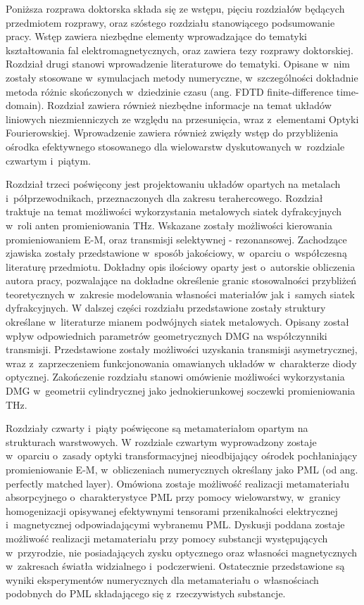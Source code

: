 Poniższa rozprawa doktorska składa się ze wstępu, pięciu rozdziałów  będących przedmiotem rozprawy, oraz szóstego rozdziału stanowiącego podsumowanie pracy. Wstęp zawiera niezbędne elementy wprowadzające do tematyki kształtowania fal elektromagnetycznych, oraz zawiera tezy rozprawy doktorskiej. Rozdział drugi stanowi wprowadzenie literaturowe do tematyki. Opisane w~nim zostały stosowane w~symulacjach metody numeryczne, w~szczególności dokładnie metoda różnic skończonych w~dziedzinie czasu (ang. FDTD finite-difference time-domain). Rozdział zawiera również niezbędne informacje na temat układów liniowych niezmienniczych ze względu na przesunięcia, wraz z~elementami Optyki Fourierowskiej. Wprowadzenie zawiera również zwięzły wstęp do przybliżenia ośrodka efektywnego stosowanego dla wielowarstw dyskutowanych w~rozdziale czwartym i~piątym.

Rozdział trzeci poświęcony jest projektowaniu układów opartych na metalach i~półprzewodnikach, przeznaczonych dla zakresu terahercowego. Rozdział traktuje na temat możliwości wykorzystania metalowych siatek dyfrakcyjnych w~roli anten promieniowania THz. Wskazane zostały możliwości kierowania promieniowaniem E-M, oraz transmisji  selektywnej - rezonansowej. Zachodzące zjawiska zostały przedstawione w~sposób jakościowy, w~oparciu o~współczesną literaturę przedmiotu. Dokładny opis ilościowy oparty jest o~autorskie obliczenia autora pracy, pozwalające na dokładne określenie granic stosowalności przybliżeń teoretycznych w~zakresie modelowania własności materiałów jak i~samych siatek dyfrakcyjnych. W dalszej części rozdziału przedstawione zostały struktury określane w~literaturze mianem podwójnych siatek metalowych. Opisany został wpływ odpowiednich parametrów geometrycznych DMG na współczynniki transmisji. Przedstawione zostały możliwości uzyskania transmisji asymetrycznej, wraz z~zaprzeczeniem funkcjonowania omawianych układów w~charakterze diody optycznej. Zakończenie rozdziału stanowi omówienie możliwości wykorzystania DMG w~geometrii cylindrycznej jako jednokierunkowej soczewki promieniowania THz.

Rozdziały czwarty i~piąty poświęcone są metamateriałom opartym na strukturach warstwowych. W rozdziale czwartym wyprowadzony zostaje w~oparciu o~zasady optyki transformacyjnej nieodbijający ośrodek pochłaniający promieniowanie E-M, w~obliczeniach numerycznych określany jako PML (od ang. perfectly matched layer). Omówiona zostaje możliwość realizacji metamateriału absorpcyjnego o~charakterystyce PML przy pomocy wielowarstwy, w~granicy homogenizacji opisywanej efektywnymi tensorami przenikalności elektrycznej i~magnetycznej odpowiadającymi wybranemu PML. Dyskusji poddana zostaje możliwość realizacji metamateriału przy pomocy substancji występujących w~przyrodzie, nie posiadających zysku optycznego oraz własności magnetycznych w~zakresach światła widzialnego i~podczerwieni. Ostatecznie przedstawione są wyniki eksperymentów numerycznych dla metamateriału o~własnościach podobnych do PML składającego się z~rzeczywistych substancje.

